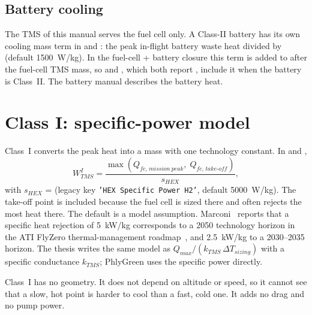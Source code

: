\documentclass[a4paper,11pt]{article}
\begin{document}
\subsection{Battery cooling}\label{sec:battery-hex}
The TMS of this manual serves the fuel cell only. A Class-II battery has its own cooling
mass term in  and : the peak in-flight
battery waste heat  divided by
 (default \SI{1500}{W/kg}). In the
fuel-cell + battery closure this term is added to  after the
fuel-cell TMS mass, so  and , which both
report , include it when the battery is Class~II.
The battery manual describes the battery heat.

\section{Class I: specific-power model}\label{sec:class1}

Class~I converts the peak heat into a mass with one technology constant. In
 and ,
\begin{equation}
  W_{TMS}^{I} = \frac{\max\left(Q_{fc,\,mission\ peak},\; Q_{fc,\,take\text{-}off}\right)}{s_{HEX}},
  \label{eq:class1}
\end{equation}
with $s_{HEX}$ =  (legacy key
\texttt{'HEX Specific Power H2'}, default \SI{5000}{W/kg}). The take-off point is included
because the fuel cell is sized there and often rejects the most heat there. The default is
a model assumption. Marconi~\cite{marconi2026} reports that a specific heat rejection of
\SI{5}{kW/kg} corresponds to a 2050 technology horizon in the ATI FlyZero thermal-management
roadmap~\cite{flyzero}, and \SI{2.5}{kW/kg} to a 2030--2035 horizon. The thesis writes the
same model as $Q_{max}/(k_{TMS}\,\Delta T_{sizing})$ with a specific conductance $k_{TMS}$;
PhlyGreen uses the specific power directly.

Class~I has no geometry. It does not depend on altitude or speed, so it cannot see that a
slow, hot point is harder to cool than a fast, cold one. It adds no drag and no pump power.
\end{document}
